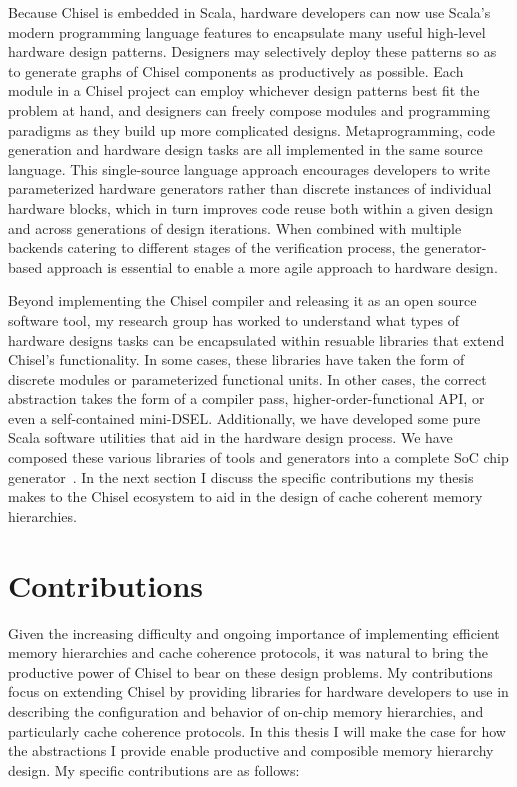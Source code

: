 Because Chisel is embedded in Scala, hardware developers can now use Scala's modern programming language features to encapsulate many useful high-level hardware design patterns.
Designers may selectively deploy these patterns so as to generate graphs of Chisel components as productively as possible.
Each module in a Chisel project can employ whichever design patterns best fit the problem at hand, and designers can freely compose modules and programming paradigms as they build up more complicated designs.
Metaprogramming, code generation and hardware design tasks are all implemented in the same source language.
This single-source language approach encourages developers to write parameterized hardware generators rather than discrete instances of individual hardware blocks,
which in turn improves code reuse both within a given design and across generations of design iterations.
When combined with multiple backends catering to different stages of the verification process, the generator-based approach is essential to enable a more agile approach to hardware design.

Beyond implementing the Chisel compiler and releasing it as an open source software tool, my research group has worked to understand what types of hardware designs tasks can be encapsulated within resuable libraries that extend Chisel's functionality.
In some cases, these libraries have taken the form of discrete modules or parameterized functional units.
In other cases, the correct abstraction takes the form of a compiler pass, higher-order-functional API, or even a self-contained mini-DSEL.
Additionally, we have developed some pure Scala software utilities that aid in the hardware design process.
We have composed these various libraries of tools and generators into a complete SoC chip generator~\cite{rocket}.
In the next section I discuss the specific contributions my thesis makes to the Chisel ecosystem to aid in the design of cache coherent memory hierarchies.

\section{Contributions}

Given the increasing difficulty and ongoing importance of implementing efficient memory hierarchies and cache coherence protocols, it was natural to bring the productive power of Chisel to bear on these design problems.
My contributions focus on extending Chisel by providing libraries for hardware developers to use in describing the configuration and behavior of on-chip memory hierarchies, and particularly cache coherence protocols.
In this thesis I will make the case for how the abstractions I provide enable productive and composible memory hierarchy design.
My specific contributions are as follows:

